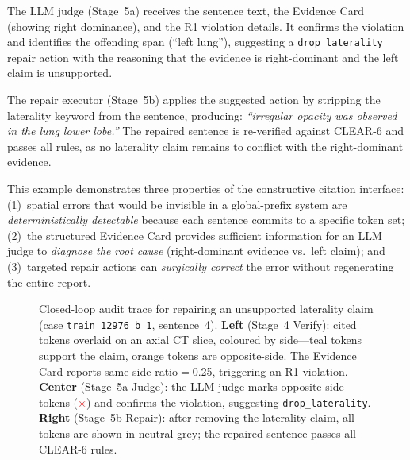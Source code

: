 The LLM judge (Stage~5a) receives the sentence text, the Evidence Card (showing right dominance), and the R1 violation details.
It confirms the violation and identifies the offending span (``left lung''), suggesting a \texttt{drop\_laterality} repair action with the reasoning that the evidence is right-dominant and the left claim is unsupported.

The repair executor (Stage~5b) applies the suggested action by stripping the laterality keyword from the sentence, producing: \emph{``irregular opacity was observed in the lung lower lobe.''}
The repaired sentence is re-verified against \textsc{CLEAR}-6 and passes all rules, as no laterality claim remains to conflict with the right-dominant evidence.

This example demonstrates three properties of the constructive citation interface: (1)~spatial errors that would be invisible in a global-prefix system are \emph{deterministically detectable} because each sentence commits to a specific token set; (2)~the structured Evidence Card provides sufficient information for an LLM judge to \emph{diagnose the root cause} (right-dominant evidence vs.\ left claim); and (3)~targeted repair actions can \emph{surgically correct} the error without regenerating the entire report.

\begin{figure}[t]
\centering
\caption{Closed-loop audit trace for repairing an unsupported laterality claim (case \texttt{train\_12976\_b\_1}, sentence~4).
\textbf{Left} (Stage~4 Verify): cited tokens overlaid on an axial CT slice, coloured by side---teal tokens support the claim, orange tokens are opposite-side. The Evidence Card reports same-side ratio$=$0.25, triggering an R1 violation.
\textbf{Center} (Stage~5a Judge): the LLM judge marks opposite-side tokens (\textcolor{red}{$\times$}) and confirms the violation, suggesting \texttt{drop\_laterality}.
\textbf{Right} (Stage~5b Repair): after removing the laterality claim, all tokens are shown in neutral grey; the repaired sentence passes all \textsc{CLEAR}-6 rules.}
\label{fig:case_study}
\end{figure}
